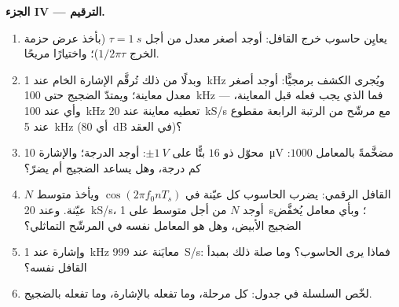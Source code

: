 \begin{problem}
\medskip
\noindent\textbf{الجزء IV --- الترقيم.}
\begin{enumerate}[resume]
  \item يعايِن حاسوب خرج القافل: أوجد أصغر معدل من أجل
        $\tau = \qty{1}{s}$ (بأخذ عرض حزمة الخرج $1/2\pi\tau$)؛ واختيارًا
        مريحًا.
  \item وبدلًا من ذلك تُرقَّم الإشارة الخام عند \qty{1}{kHz} ويُجرى
        الكشف برمجيًّا: أوجد أصغر معدل معاينة؛ ويمتدّ الضجيج
        حتى \qty{100}{kHz} --- فما الذي يجب فعله قبل المعاينة،
        وأي  عند \qty{100}{kHz} تعطيه معاينة عند
        \qty{20}{kS/s} مع مرشّح من الرتبة الرابعة مقطوع عند \qty{5}{kHz}
        (أي \qty{80}{dB} في العقد)؟
  \item محوّل ذو $16$ بتًّا على $\pm\qty{1}{V}$: أوجد الدرجة؛ والإشارة \qty{10}{\micro V}
        مضخَّمةً بالمعامل $1000$: كم درجة، وهل يساعد الضجيج أم يضرّ؟
  \item القافل الرقمي: يضرب الحاسوب كل عيّنة في
        $\cos(2\pi f_0nT_s)$ ويأخذ متوسط $N$ عيّنة. وعند \qty{20}{kS/s}،
        أوجد $N$ من أجل متوسط على \qty{1}{s}؛ وبأي معامل يُخفَّض الضجيج الأبيض،
        وهل هو المعامل نفسه في المرشّح التماثلي؟
  \item وإشارة عند \qty{1}{kHz} معايَنة عند \qty{999}{S/s}: فماذا يرى
        الحاسوب؟ وما صلة ذلك بمبدأ القافل
        نفسه؟
  \item لخّص السلسلة في جدول: كل مرحلة، وما تفعله
        بالإشارة، وما تفعله بالضجيج.
\end{enumerate}
\end{problem}
